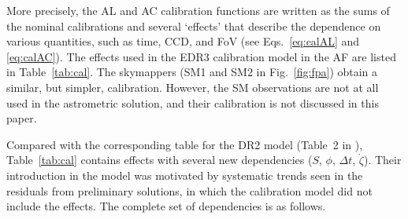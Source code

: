 \documentclass[longauth]{aa} %
\begin{document}
More precisely, the AL and AC calibration functions are written as the 
sums of the nominal calibrations and several `effects' that describe the dependence on 
various quantities, such as time, CCD, and FoV (see Eqs.~\ref{eq:calAL} and \ref{eq:calAC}). 
The effects used in the EDR3 calibration model in the AF
are listed in Table~\ref{tab:cal}.
The skymappers (SM1 and SM2 in Fig.~\ref{fig:fpa}) obtain a similar, but simpler, 
calibration. However, the SM observations are not at all used in the astrometric solution, 
and their calibration is not discussed in this paper.

Compared with the corresponding table for the 
DR2 model (Table~2 in ), Table~\ref{tab:cal} contains effects with
several new dependencies ($S$, $\phi$, $\Delta t$, $\dot{\zeta}$). Their introduction
in the model was motivated by systematic trends seen in the residuals from preliminary 
solutions, in which the calibration model did not include the effects. 
The complete set of dependencies is as follows.
\end{document}
